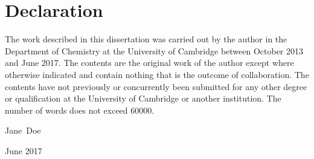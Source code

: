 \chapter*{\sc Declaration}
The work described in this dissertation was carried out by the author in the Department of Chemistry at the University of Cambridge between October 2013 and June 2017. The contents are the original work of the author except where otherwise indicated and contain nothing that is the outcome of collaboration. The contents have not previously or concurrently been submitted for any other degree or qualification at the University of Cambridge or another institution. The number of words does not exceed 60000.

\vspace{10ex}

\begin{flushright}
Jane~Doe%


June 2017
\end{flushright}

\vfill
